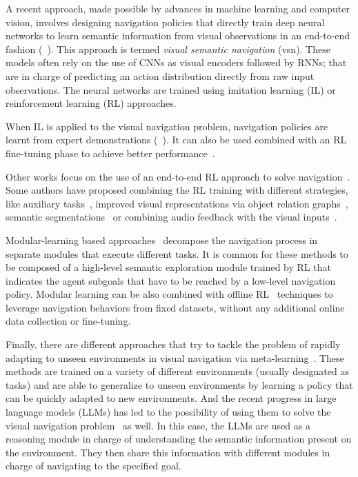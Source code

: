 A recent approach, made possible by advances in machine learning and computer vision, involves designing navigation policies that directly train deep neural networks to learn semantic information from visual observations in an end-to-end fashion (\eg~\cite{ramrakhya2022,yadav2022, gutierrez2019, khandelwal2022, chaplot2020,chang2020}).
This approach is termed \textit{visual semantic navigation} (\acrshort{vsn}).
These models often rely on the use of CNNs as visual encoders followed by RNNs; that are in charge of predicting an action distribution directly from raw input observations.
The neural networks are trained using imitation learning (IL) or reinforcement learning (RL) approaches.

When IL is applied to the visual navigation problem, navigation policies are learnt from expert demonstrations (\eg~\cite{ramrakhya2022,yadav2022}).
It can also be used combined with an RL fine-tuning phase to achieve better performance~\cite{ramrakhya2023}.

Other works focus on the use of an end-to-end RL approach to solve \objnav navigation~\cite{zhu2017, gutierrez2019, wijmans2020, khandelwal2022, Liu2022, Yadav2023OVRLV2AS, Xu2024DeepRL, YokoyamaHM3DOVONAD}.
Some authors have proposed combining the RL training with different strategies, like auxiliary tasks~\cite{ye2021}, improved visual representations via object relation graphs~\cite{yang2018}, semantic segmentations~\cite{Mousavian2018} or combining audio feedback with the visual inputs~\cite{Wang2023, Kondoh2023MultigoalAN}.

Modular-learning based approaches~\cite{chaplot2020, chang2020, skillfusion, Li2023RDDRLAR, zhou2022improving, Cai2024DGMemLV, Kang2024HSPNavHS, Wang2023ProbableOL, Wasserman2023ExploitationGuidedEF, Yokoyama2023VLFMVF} decompose the navigation process in separate modules that execute different tasks.
It is common for these methods to be composed of a high-level semantic exploration module trained by RL that indicates the agent subgoals that have to be reached by a low-level navigation policy.
Modular learning can be also combined with offline RL~\cite{shah2022} techniques to leverage navigation behaviors from fixed datasets, without any additional online data collection or fine-tuning.

Finally, there are different approaches that try to tackle the problem of rapidly adapting to unseen environments in visual navigation via meta-learning~\cite{wortsman2019, luo2021, zhang2022}.
These methods are trained on a variety of different environments (usually designated as tasks) and are able to generalize to unseen environments by learning a policy that can be quickly adapted to new environments.
And the recent progress in large language models (LLMs) has led to the possibility of using them to solve the visual navigation problem~\cite{Huang2023, Zhou2023} as well.
In this case, the LLMs are used as a reasoning module in charge of understanding the semantic information present on the environment.
They then share this information with different modules in charge of navigating to the specified goal.

